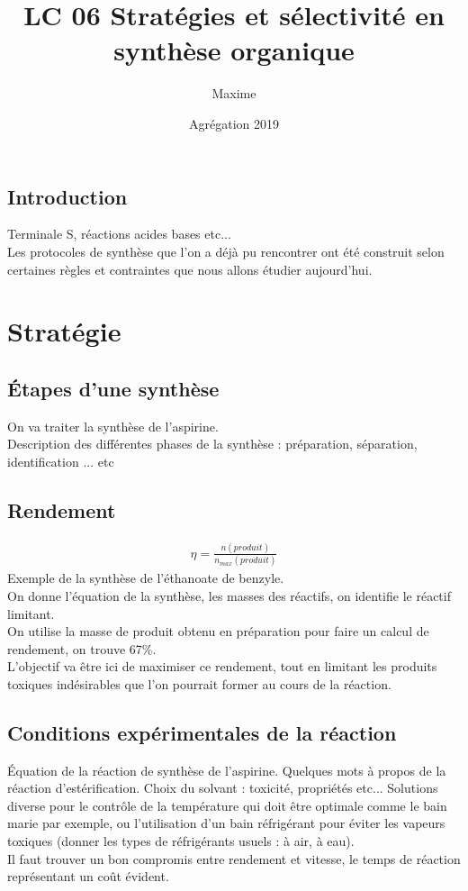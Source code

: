 \documentclass[12pt,prb,aps,epsf]{article}
\begin{document}
	
	\title{LC 06 Stratégies et sélectivité en synthèse organique}
		\author{Maxime}
		\date{Agrégation 2019}
		
	\maketitle
	
	\tableofcontents
	
	\pagebreak

\subsection*{Introduction}
Terminale S, réactions acides bases etc...\\

Les protocoles de synthèse que l'on a déjà pu rencontrer ont été construit selon certaines règles et contraintes que nous allons étudier aujourd'hui.

\section{Stratégie}
\subsection{Étapes d'une synthèse}
On va traiter la synthèse de l'aspirine.\\ 
Description des différentes phases de la synthèse : préparation, séparation, identification ... etc

\subsection{Rendement}
\begin{eqnarray}
\eta = \frac{n(produit)}{n_{max}(produit)}
\end{eqnarray}
Exemple de la synthèse de l'éthanoate de benzyle.\\ 
On donne l'équation de la synthèse, les masses des réactifs, on identifie le réactif limitant.\\
On utilise la masse de produit obtenu en préparation pour faire un calcul de rendement, on trouve 67\%.\\

L'objectif va être ici de maximiser ce rendement, tout en limitant les produits toxiques indésirables que l'on pourrait former au cours de la réaction.

\subsection{Conditions expérimentales de la réaction}
Équation de la réaction de synthèse de l'aspirine. Quelques mots à propos de la réaction d'estérification. Choix du solvant : toxicité, propriétés etc... Solutions diverse pour le contrôle de la température qui doit être optimale comme le bain marie par exemple, ou l'utilisation d'un bain réfrigérant pour éviter les vapeurs toxiques (donner les types de réfrigérants usuels : à air, à eau).\\
Il faut trouver un bon compromis entre rendement et vitesse, le temps de réaction représentant un coût évident.\\
\end{document}

